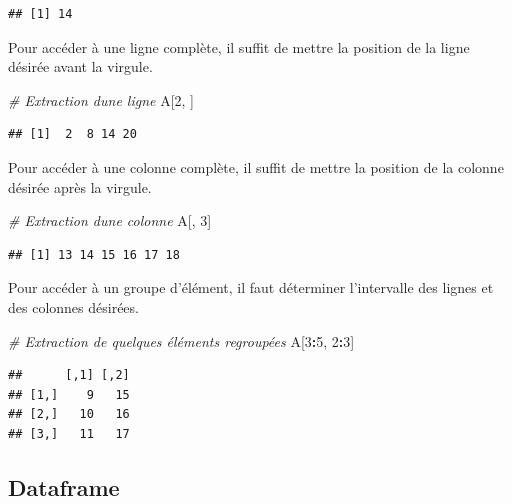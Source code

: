 \documentclass[
]{book}
\newenvironment{Shaded}{\begin{snugshade}}{\end{snugshade}}
\newcommand{\CommentTok}[1]{\textcolor[rgb]{0.56,0.35,0.01}{\textit{#1}}}
\newcommand{\DecValTok}[1]{\textcolor[rgb]{0.00,0.00,0.81}{#1}}
\newcommand{\NormalTok}[1]{#1}
\newcommand{\SpecialCharTok}[1]{\textcolor[rgb]{0.81,0.36,0.00}{\textbf{#1}}}
\begin{document}
\begin{verbatim}
## [1] 14
\end{verbatim}

Pour accéder à une ligne complète, il suffit de mettre la position de la ligne désirée avant la virgule.

\begin{Shaded}
\begin{Highlighting}[]
\CommentTok{\# Extraction d\textquotesingle{}une ligne}
\NormalTok{A[}\DecValTok{2}\NormalTok{, ]}
\end{Highlighting}
\end{Shaded}

\begin{verbatim}
## [1]  2  8 14 20
\end{verbatim}

Pour accéder à une colonne complète, il suffit de mettre la position de la colonne désirée après la virgule.

\begin{Shaded}
\begin{Highlighting}[]
\CommentTok{\# Extraction d\textquotesingle{}une colonne}
\NormalTok{A[, }\DecValTok{3}\NormalTok{]}
\end{Highlighting}
\end{Shaded}

\begin{verbatim}
## [1] 13 14 15 16 17 18
\end{verbatim}

Pour accéder à un groupe d'élément, il faut déterminer l'intervalle des lignes et des colonnes désirées.

\begin{Shaded}
\begin{Highlighting}[]
\CommentTok{\# Extraction de quelques éléments regroupées}
\NormalTok{A[}\DecValTok{3}\SpecialCharTok{:}\DecValTok{5}\NormalTok{, }\DecValTok{2}\SpecialCharTok{:}\DecValTok{3}\NormalTok{]}
\end{Highlighting}
\end{Shaded}

\begin{verbatim}
##      [,1] [,2]
## [1,]    9   15
## [2,]   10   16
## [3,]   11   17
\end{verbatim}

\subsection{Dataframe}\label{dataframe}
\end{document}
